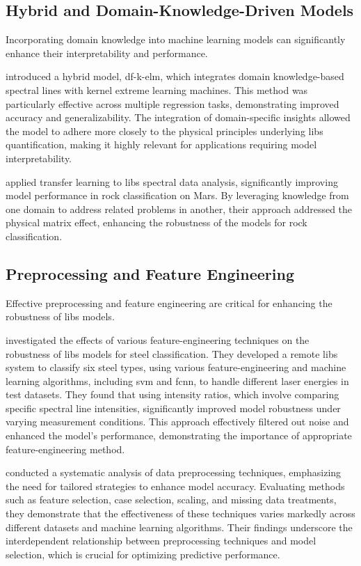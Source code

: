 \subsection{Hybrid and Domain-Knowledge-Driven Models}
Incorporating domain knowledge into machine learning models can significantly enhance their interpretability and performance.

\citet{song_DF-K-ELM} introduced a hybrid model, \gls{df}-\gls{k-elm}, which integrates domain knowledge-based spectral lines with kernel extreme learning machines.
This method was particularly effective across multiple regression tasks, demonstrating improved accuracy and generalizability.
The integration of domain-specific insights allowed the model to adhere more closely to the physical principles underlying \gls{libs} quantification, making it highly relevant for applications requiring model interpretability.

\citet{sunMachineLearningTransfer2021} applied transfer learning to \gls{libs} spectral data analysis, significantly improving model performance in rock classification on Mars.
By leveraging knowledge from one domain to address related problems in another, their approach addressed the physical matrix effect, enhancing the robustness of the models for rock classification.

\subsection{Preprocessing and Feature Engineering}
Effective preprocessing and feature engineering are critical for enhancing the robustness of \gls{libs} models.

\citet{jeonEffectsFeatureEngineering2024} investigated the effects of various feature-engineering techniques on the robustness of \gls{libs} models for steel classification.
They developed a remote \gls{libs} system to classify six steel types, using various feature-engineering and machine learning algorithms, including \gls{svm} and \gls{fcnn}, to handle different laser energies in test datasets.
They found that using intensity ratios, which involve comparing specific spectral line intensities, significantly improved model robustness under varying measurement conditions.
This approach effectively filtered out noise and enhanced the model's performance, demonstrating the importance of appropriate feature-engineering method.

\citet{Huang2015AnEA} conducted a systematic analysis of data preprocessing techniques, emphasizing the need for tailored strategies to enhance model accuracy.
Evaluating methods such as feature selection, case selection, scaling, and missing data treatments, they demonstrate that the effectiveness of these techniques varies markedly across different datasets and machine learning algorithms.
Their findings underscore the interdependent relationship between preprocessing techniques and model selection, which is crucial for optimizing predictive performance.

